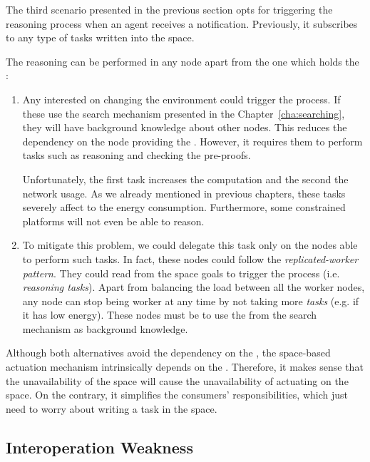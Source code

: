 The third scenario presented in the previous section opts for triggering the reasoning process when an agent receives a notification.
Previously, it subscribes to any type of tasks written into the space.


The reasoning can be performed in any node apart from the one which holds the \Space{}:

\begin{enumerate}
  \item Any \consumer{} interested on changing the environment could trigger the process.
	If these \consumers{} use the search mechanism presented in the Chapter~\ref{cha:searching}, they will have background knowledge about other nodes.
	This reduces the dependency on the node providing the \coordspace{}.
	However, it requires them to perform tasks such as reasoning and checking the pre-proofs.
	
	Unfortunately, the first task increases the computation and the second the network usage.
	As we already mentioned in previous chapters, these tasks severely affect to the energy consumption.
	Furthermore, some constrained platforms will not even be able to reason.
	
  \item To mitigate this problem, we could delegate this task only on the nodes able to perform such tasks.
	In fact, these nodes could follow the \emph{replicated-worker pattern}.
	They could read from the space goals to trigger the process (i.e. \emph{reasoning tasks}).
	Apart from balancing the load between all the worker nodes, any node can stop being worker at any time by not taking more \emph{tasks} (e.g. if it has low energy).
	These nodes must be \consumers{} to use the \clues{} from the search mechanism as background knowledge.
\end{enumerate}


Although both alternatives avoid the dependency on the \Space{}, the space-based actuation mechanism intrinsically depends on the \Space{}.
Therefore, it makes sense that the unavailability of the space will cause the unavailability of actuating on the space.
On the contrary, it simplifies the consumers' responsibilities, which just need to worry about writing a task in the space.



\subsection{Interoperation Weakness}

